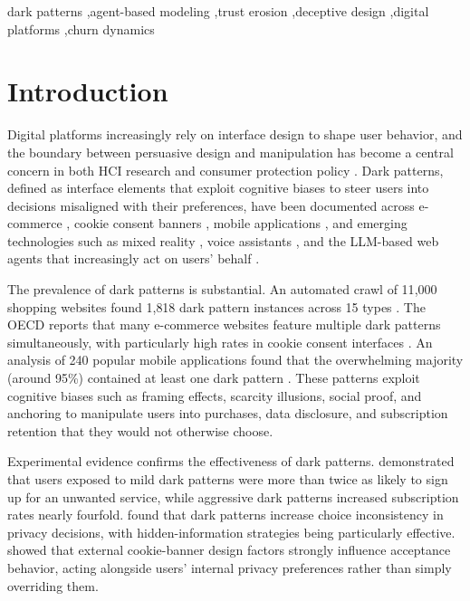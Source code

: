 \documentclass[a4paper,fleqn]{cas-sc}
\begin{document}
\begin{keywords}
dark patterns \sep agent-based modeling \sep trust erosion \sep deceptive design \sep digital platforms \sep churn dynamics
\end{keywords}

\maketitle

\section{Introduction}
Digital platforms increasingly rely on interface design to shape user behavior, and the boundary between persuasive design and manipulation has become a central concern in both HCI research and consumer protection policy \citep{gray2018,yi2025}. Dark patterns, defined as interface elements that exploit cognitive biases to steer users into decisions misaligned with their preferences, have been documented across e-commerce \citep{mathur2019}, cookie consent banners \citep{berens2024}, mobile applications \citep{gunawan2021}, and emerging technologies such as mixed reality \citep{meinhardt2025}, voice assistants \citep{deconca2023}, and the LLM-based web agents that increasingly act on users' behalf \citep{ersoy2026}.

The prevalence of dark patterns is substantial. An automated crawl of 11{,}000 shopping websites found 1{,}818 dark pattern instances across 15 types \citep{mathur2019}. The OECD reports that many e-commerce websites feature multiple dark patterns simultaneously, with particularly high rates in cookie consent interfaces \citep{oecd2022}. An analysis of 240 popular mobile applications found that the overwhelming majority (around 95\%) contained at least one dark pattern \citep{digeronimo2020}. These patterns exploit cognitive biases such as framing effects, scarcity illusions, social proof, and anchoring to manipulate users into purchases, data disclosure, and subscription retention that they would not otherwise choose.

Experimental evidence confirms the effectiveness of dark patterns. \citet{luguri2021} demonstrated that users exposed to mild dark patterns were more than twice as likely to sign up for an unwanted service, while aggressive dark patterns increased subscription rates nearly fourfold. \citet{bogliacino2026} found that dark patterns increase choice inconsistency in privacy decisions, with hidden-information strategies being particularly effective. \citet{papenmeier2025} showed that external cookie-banner design factors strongly influence acceptance behavior, acting alongside users' internal privacy preferences rather than simply overriding them.
\end{document}
